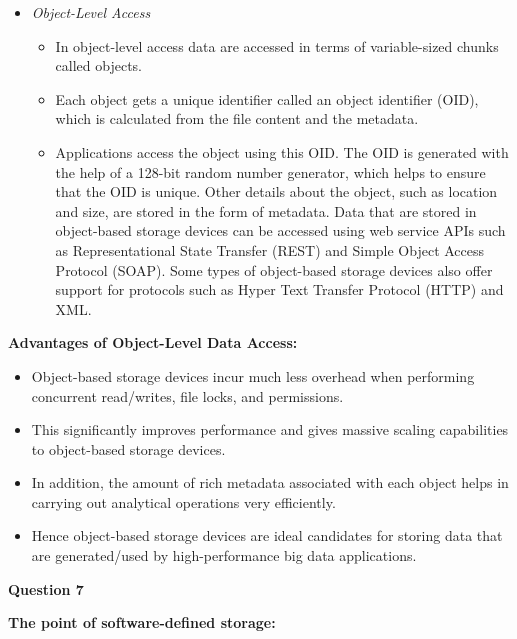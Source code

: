 \documentclass[a4paper, 12pt]{article}
\begin{document}
\begin{itemize}
\item
\textit{Object-Level Access}
\begin{itemize}
\item
In object-level access data are accessed in terms of variable-sized chunks called objects.
\item
Each object gets a unique identifier called an object identifier (OID), which is calculated from the file content and the metadata.
\item
Applications access the object using this OID. The OID is generated with the help of a 128-bit random number generator, which helps to ensure that the OID is unique. Other details about the object, such as location and size, are stored in the form of metadata. Data that are stored in object-based storage devices can be accessed using web service APIs such as Representational State Transfer (REST) and Simple Object Access Protocol (SOAP). Some types of object-based storage devices also offer support for protocols such as Hyper Text Transfer Protocol (HTTP) and XML.
\end{itemize}
\end{itemize}

\textbf{Advantages of Object-Level Data Access:}
\begin{itemize}
\item
Object-based storage devices incur much less overhead when performing concurrent read/writes, file locks, and permissions.
\item
This significantly improves performance and gives massive scaling capabilities to object-based storage devices.
\item
In addition, the amount of rich metadata associated with each object helps in carrying out analytical operations very efficiently.
\item
Hence object-based storage devices are ideal candidates for storing data that are generated/used by high-performance big data applications.
\end{itemize}

\newpage
\begin{center}
\textbf{Question 7}
\end{center}

\textbf{The point of software-defined storage:}
\end{document}
